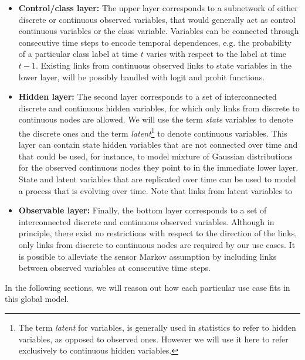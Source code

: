 \begin{itemize}

\item \textbf{Control/class layer:} The upper layer corresponds to a subnetwork of either discrete or continuous observed variables, that would generally act as control continuous variables or the class variable. Variables can be connected through consecutive time steps to encode temporal dependences, e.g. the probability of a particular class label at time $t$ varies with respect to the label at time $t-1$. Existing links from continuous observed links to state variables in the lower layer, will be possibly handled with logit and probit functions.

\item \textbf{Hidden layer:}  The second layer corresponds to a set of interconnected discrete and continuous hidden variables, for which only links from discrete to continuous nodes are allowed. We will use the term \textit{state} variables to denote the discrete ones and the term \textit{latent}\footnote{The term \textit{latent} for variables, is generally used in statistics to refer to hidden variables, as opposed to observed ones. However we will use it here to refer exclusively to continuous hidden variables.} to denote continuous variables. This layer can contain state hidden variables that are not connected over time and that could be used, for instance, to model mixture of Gaussian distributions for the observed continuous nodes they point to in the immediate lower layer. State and latent variables that are replicated over time can be used to model a process that is evolving over time. Note that links from latent variables to 

\item \textbf{Observable layer:} Finally, the bottom layer corresponds to a set of interconnected discrete and continuous observed variables. Although in principle, there exist no restrictions with respect to the direction of the links, only links from discrete to continuous nodes are required by our use cases. It is possible to alleviate the sensor Markov assumption by including links between observed variables at consecutive time steps.

\end{itemize} 

In the following sections, we will reason out how each particular use case fits in this global model.


